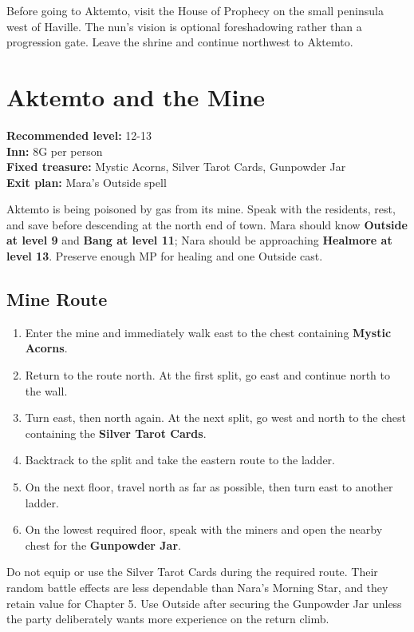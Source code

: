 \documentclass[
  american,
  10pt,
  letterpaper,
  oneside,
  open=any]{scrreprt}
\providecommand{\tightlist}{%
  \setlength{\itemsep}{0pt}\setlength{\parskip}{0pt}}
\begin{document}
Before going to Aktemto, visit the House of Prophecy on the small
peninsula west of Haville. The nun's vision is optional foreshadowing
rather than a progression gate. Leave the shrine and continue northwest
to Aktemto.

\section{Aktemto and the Mine}\label{aktemto-and-the-mine}

\textbf{Recommended level:} 12-13\\
\textbf{Inn:} 8G per person\\
\textbf{Fixed treasure:} Mystic Acorns, Silver Tarot Cards, Gunpowder
Jar\\
\textbf{Exit plan:} Mara's Outside spell

Aktemto is being poisoned by gas from its mine. Speak with the
residents, rest, and save before descending at the north end of town.
Mara should know \textbf{Outside at level 9} and \textbf{Bang at level
11}; Nara should be approaching \textbf{Healmore at level 13}. Preserve
enough MP for healing and one Outside cast.

\subsection{Mine Route}\label{mine-route}

\begin{enumerate}
\def\labelenumi{\arabic{enumi}.}
\tightlist
\item
  Enter the mine and immediately walk east to the chest containing
  \textbf{Mystic Acorns}.
\item
  Return to the route north. At the first split, go east and continue
  north to the wall.
\item
  Turn east, then north again. At the next split, go west and north to
  the chest containing the \textbf{Silver Tarot Cards}.
\item
  Backtrack to the split and take the eastern route to the ladder.
\item
  On the next floor, travel north as far as possible, then turn east to
  another ladder.
\item
  On the lowest required floor, speak with the miners and open the
  nearby chest for the \textbf{Gunpowder Jar}.
\end{enumerate}

Do not equip or use the Silver Tarot Cards during the required route.
Their random battle effects are less dependable than Nara's Morning
Star, and they retain value for Chapter 5. Use Outside after securing
the Gunpowder Jar unless the party deliberately wants more experience on
the return climb.
\end{document}
